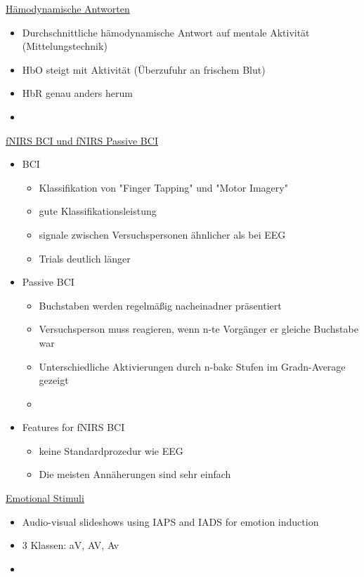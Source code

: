 \documentclass[a4paper,10pt,oneside]{article}
\begin{document}
\underline{Hämodynamische Antworten} \\
 	\begin{itemize}
 		\item Durchschnittliche hämodynamische Antwort auf mentale Aktivität (Mittelungstechnik)
 		\item HbO steigt mit Aktivität (Überzufuhr an frischem Blut)
 		\item HbR genau anders herum 
 		\item[] %
 	\end{itemize}
 	
\underline{fNIRS BCI und fNIRS Passive BCI} \\
 	\begin{itemize}
 		\item BCI
 			\begin{itemize}
 				\item Klassifikation von "Finger Tapping" und "Motor Imagery"
 				\item gute Klassifikationsleistung
 				\item signale zwischen Versuchspersonen ähnlicher als bei EEG
 				\item Trials deutlich länger
 			\end{itemize}
		\item Passive BCI
			\begin{itemize}
				\item Buchstaben werden regelmäßig nacheinadner präsentiert
				\item Versuchsperson muss reagieren, wenn n-te Vorgänger er gleiche Buchstabe war
				\item Unterschiedliche Aktivierungen durch n-bakc Stufen im Gradn-Average gezeigt
				\item[] %
			\end{itemize}
		\item Features for fNIRS BCI
			\begin{itemize}
				\item keine Standardprozedur wie EEG
				\item Die meisten Annäherungen sind sehr einfach
			\end{itemize}
 	\end{itemize}
 

\underline{Emotional Stimuli} \\ 		
	\begin{itemize}
		\item Audio-visual slideshows using IAPS and IADS for emotion induction
		\item 3 Klassen: aV, AV, Av
		\item[] %
	\end{itemize}
	
\end{document}
